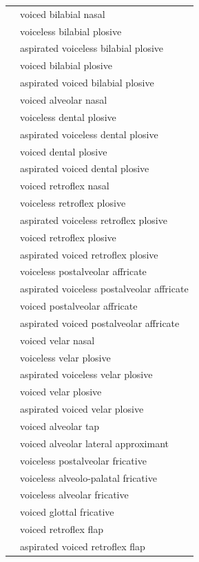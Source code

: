 \documentclass{article}
\begin{document}
\begin{xltabular}{\textwidth}{lL}
   & voiced bilabial nasal \\
   & voiceless bilabial plosive \\
   & aspirated voiceless bilabial plosive \\
   & voiced bilabial plosive \\
   & aspirated voiced bilabial plosive \\
   & voiced alveolar nasal \\
   & voiceless dental plosive \\
   & aspirated voiceless dental plosive \\
   & voiced dental plosive \\
   & aspirated voiced dental plosive \\
   & voiced retroflex nasal \\
   & voiceless retroflex plosive \\
   & aspirated voiceless retroflex plosive \\
   & voiced retroflex plosive \\
   & aspirated voiced retroflex plosive \\
  \ipa{\t{\textteshlig}} & voiceless postalveolar affricate \\
   & aspirated voiceless postalveolar affricate \\
  \ipa{\t{\textdyoghlig}} & voiced postalveolar affricate \\
   & aspirated voiced postalveolar affricate \\
   & voiced velar nasal \\
   & voiceless velar plosive \\
   & aspirated voiceless velar plosive \\
   & voiced velar plosive \\
   & aspirated voiced velar plosive \\
   & voiced alveolar tap \\
   & voiced alveolar lateral approximant \\
   & voiceless postalveolar fricative \\
   & voiceless alveolo-palatal fricative \\
   & voiceless alveolar fricative \\
  \ipa{\texthth} & voiced glottal fricative \\
   & voiced retroflex flap \\
   & aspirated voiced retroflex flap \\
\end{xltabular}
\end{document}

